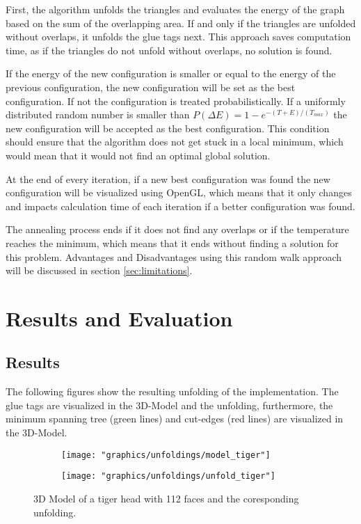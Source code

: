 \documentclass[draft,final]{vutinfth} %
\begin{document}
First, the algorithm unfolds the triangles and evaluates the energy of the graph based on the sum of the overlapping area. If and only if the triangles are unfolded without overlaps, it unfolds the glue tags next. This approach saves computation time, as if the triangles do not unfold without overlaps, no solution is found.

If the energy of the new configuration is smaller or equal to the energy of the previous configuration, the new configuration will be set as the best configuration. If not the configuration is treated probabilistically. If a uniformly distributed random number is smaller than $P(\Delta E) = 1 - e^{-(T + E)/(T_{max})}$ the new configuration will be accepted as the best configuration. This condition should ensure that the algorithm does not get stuck in a local minimum, which would mean that it would not find an optimal global solution.

At the end of every iteration, if a new best configuration was found the new configuration will be visualized using OpenGL, which means that it only changes and impacts calculation time of each iteration if a better configuration was found. 

The annealing process ends if it does not find any overlaps or if the temperature reaches the minimum, which means that it ends without finding a solution for this problem. Advantages and Disadvantages using this random walk approach will be discussed in section \ref{sec:limitations}.

\chapter{Results and Evaluation}
\label{chap:reseval}

\section{Results}
The following figures show the resulting unfolding of the implementation. The glue tags are visualized in the 3D-Model and the unfolding, furthermore, the minimum spanning tree (green lines) and cut-edges (red lines) are visualized in the 3D-Model.

\begin{figure}
  \begin{subfigure}[b]{0.5\textwidth}
    \texttt{[image: "graphics/unfoldings/model\_tiger"]}
  \end{subfigure}
  \begin{subfigure}[b]{0.5\textwidth}
    \texttt{[image: "graphics/unfoldings/unfold\_tiger"]}
  \end{subfigure}
  
  \caption{3D Model of a tiger head with 112 faces and the coresponding unfolding.}
  \label{fig:tiger}
\end{figure}
\end{document}
